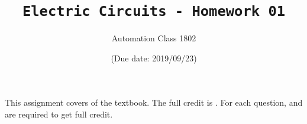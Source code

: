 \documentclass[12pt,a4paper]{article}
\title{\textbf{\texttt{Electric Circuits - Homework 01}}}
\author{Automation Class 1802}
\date{(Due date: 2019/09/23)}
\begin{document}
\maketitle

{\large This assignment covers  of the textbook. The full credit is . For each question,  and  are required to get full credit.}
\end{document}
